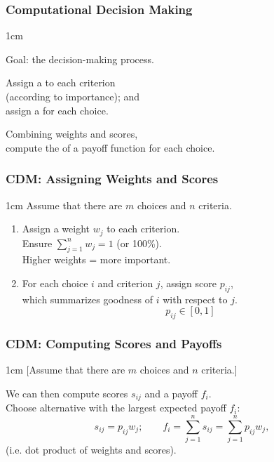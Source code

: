 \begin{frame}
\frametitle{Computational Decision Making}

\begin{changemargin}{1cm}

Goal:  the decision-making process.

Assign a  to each criterion \\ \qquad (according to importance); and\\
assign a  for each choice.

Combining weights and scores,\\
compute the  of
a payoff function for each choice.

\end{changemargin}

\end{frame}

\begin{frame}
\frametitle{CDM: Assigning Weights and Scores}

\begin{changemargin}{1cm}
Assume that there are $m$ choices and $n$ criteria. 
\begin{enumerate}
\item Assign a weight
  $w_j$ to each criterion. \\
  Ensure $\sum_{j=1}^n w_j = 1$ (or
  100\%). \\ Higher weights = more important.
\item For each choice $i$ and criterion $j$, assign score $p_{ij}$,\\
  which summarizes goodness of $i$ with respect to $j$.\\

  \[ p_{ij} \in [0, 1] \]
\end{enumerate}
\end{changemargin}
\end{frame}

\begin{frame}
\frametitle{CDM: Computing Scores and Payoffs}

\begin{changemargin}{1cm}
[Assume that there are $m$ choices and $n$ criteria.]

We can then compute scores $s_{ij}$ and a payoff $f_i$.\\

Choose alternative with
the largest expected payoff $f_i$:
\[ s_{ij} = p_{ij} w_j; \qquad f_i = \sum_{j=1}^n s_{ij} = \sum_{j=1}^n p_{ij} w_j, \]
(i.e. dot product of weights and scores).

\end{changemargin}

\end{frame}

